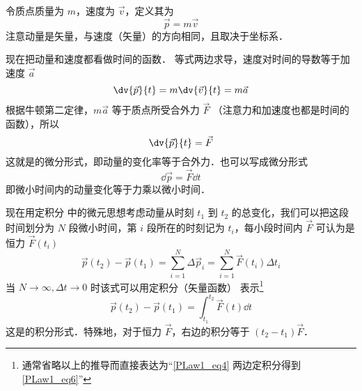 

令质点质量为 $m$，速度为 $\vec v$，定义其为
\begin{equation}
\vec p = m\vec v
\end{equation}
注意动量是矢量，与速度（矢量）的方向相同，且取决于坐标系．

现在把动量和速度都看做时间的函数． 等式两边求导，速度对时间的导数等于加速度 $\vec a$
\begin{equation}
\dv{\vec p}{t} = m \dv{\vec v}{t} = m\vec a
\end{equation}
根据牛顿第二定律，$m\vec a$ 等于质点所受合外力 $\vec F$ （注意力和加速度也都是时间的函数），所以
\begin{equation}
\dv{\vec p}{t} = \vec F
\end{equation}
这就是的微分形式，即动量的变化率等于合外力．也可以写成微分形式
\begin{equation}\label{PLaw1_eq4}
\dd{\vec p} = \vec F \dd{t}
\end{equation}
即微小时间内的动量变化等于力乘以微小时间．

现在用定积分 中的微元思想考虑动量从时刻 $t_1$ 到 $t_2$ 的总变化，我们可以把这段时间划分为 $N$ 段微小时间，第 $i$ 段所在的时刻记为 $t_i$，每小段时间内 $\vec F$ 可认为是恒力 $\vec F(t_i)$
\begin{equation}
\vec p(t_2)-\vec p(t_1) = \sum_{i=1}^{N} \Delta\vec p_i= \sum_{i=1}^{N} \vec F(t_i) \Delta t_i
\end{equation}
当 $N\to\infty, \Delta t\to 0$ 时该式可以用定积分（矢量函数）%
表示\footnote{通常省略以上的推导而直接表达为“\autoref{PLaw1_eq4} 两边定积分得到\autoref{PLaw1_eq6}”}
\begin{equation}\label{PLaw1_eq6}
\vec p(t_2)-\vec p(t_1) = \int_{t_1}^{t_2}\vec F(t) \dd{t}
\end{equation}
这是的积分形式．特殊地，对于恒力 $\vec F$，右边的积分等于 $(t_2-t_1)\vec F$．